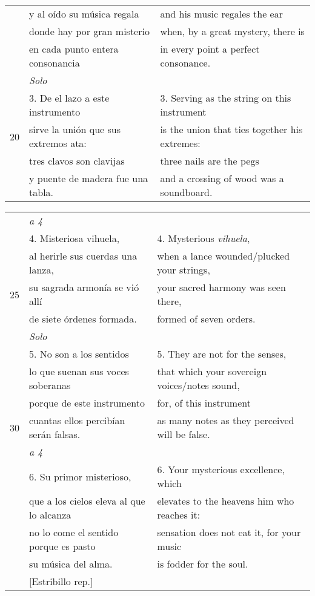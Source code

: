 \begin{tabular}{rll}
& y al oído su música regala			&	and his music regales the ear\\
& donde hay por gran misterio			&	when, by a great mystery, there is\\
& en cada punto entera consonancia	&	in every point a perfect consonance.\\ [1ex]
%
& \emph{Solo} 				& 	\\
& 3. De el lazo a este instrumento 	&	3. Serving as the string on this instrument\\
20 & sirve la unión que sus extremos ata: &	is the union that ties together his extremes:\\
& tres clavos son clavijas			&	three nails are the pegs\\
& y puente de madera fue una tabla. 	&	and a crossing of wood was a soundboard.\\
%
\end{tabular}


\begin{tabular}{rll}
%
& \emph{a 4} 				& 	\\
& 4. Misteriosa vihuela,				& 4. Mysterious \emph{vihuela},\\
& al herirle sus cuerdas una lanza,	&	when a lance wounded/plucked your strings,\\
25 & su sagrada armonía se vió allí		&	your sacred harmony was seen there,\\
& de siete órdenes formada.			&	formed of seven orders.\\ [1ex]
%
& \emph{Solo} 				& 	\\
& 5. No son a los sentidos			&	5. They are not for the senses,\\
& lo que suenan sus voces soberanas 	&	that which your sovereign voices/notes sound,\\
& porque de este instrumento			&	for, of this instrument\\
30 & cuantas ellos percibían serán falsas. 	& 	as many notes as they perceived will be false.\\ [1ex]
%
& \emph{a 4}				&	\\
& 6. Su primor misterioso,				&6.	Your mysterious excellence, which\\
& que a los cielos eleva al que lo alcanza &	elevates to the heavens him who reaches it:\\
& no lo come el sentido porque es pasto	&	sensation does not eat it, for your music\\
& su música del alma.						&	is fodder for the soul.\\ [1ex]
%
& [Estribillo rep.]			&	\\
%
\end{tabular}
